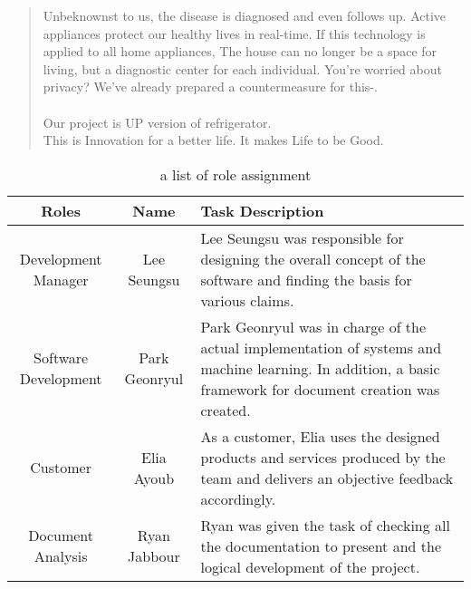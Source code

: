 \documentclass[conference]{IEEEtran}
\begin{document}
\begin{abstract}
Unbeknownst to us, the disease is diagnosed and even follows up. Active appliances protect our healthy lives in real-time. If this technology is applied to all home appliances, The house can no longer be a space for living, but a diagnostic center for each individual.
You're worried about privacy? We've already prepared a countermeasure for this-.\\
\\Our project is UP version of refrigerator.\\
This is Innovation for a better life.
It makes Life to be Good.
\end{abstract}


\begin{table}[h]
    \caption{a list of role assignment}
    \begin{tabular}{|c|c|p{3.0cm}|}
    \hline
    Roles & Name & Task Description \\ \hline
      Development Manager    & Lee Seungsu    &  Lee Seungsu was responsible for designing the overall concept of the software and finding the basis for various claims.         \\ \hline
      Software Development    & Park Geonryul  &  Park Geonryul was in charge of the actual implementation of systems and machine learning. In addition, a basic framework for document creation was created. \\ \hline
        Customer  &   Elia Ayoub   &  As a customer, Elia uses the designed products and services produced by the team and delivers an objective feedback accordingly.          \\ \hline
        Document Analysis  &    Ryan Jabbour  &   Ryan was given the task of checking all the documentation to present and the logical development of the project.            \\ \hline
    \end{tabular}
    \end{table}







\end{document}
